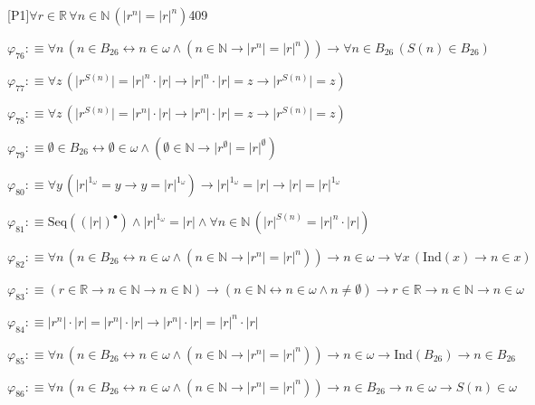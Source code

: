 \begin{fullproof}{[P1]}{$\forall r \in \mathbb{R}\,\forall n \in \mathbb{N}\,(\lvert {{r}^{n}} \rvert = {{\lvert r \rvert}^{n}})$}{409}
\begin{abbrevlist}
\item $\varphi_{76} :\equiv \forall n\,(n \in B_{26} \leftrightarrow n \in \omega \land (n \in \mathbb{N} \to \lvert {{r}^{n}} \rvert = {{\lvert r \rvert}^{n}})) \to \forall n \in B_{26}\,(S(n) \in B_{26})$
\item $\varphi_{77} :\equiv \forall z\,(\lvert {{r}^{S(n)}} \rvert = {{\lvert r \rvert}^{n}} \cdot \lvert r \rvert \to {{\lvert r \rvert}^{n}} \cdot \lvert r \rvert = z \to \lvert {{r}^{S(n)}} \rvert = z)$
\item $\varphi_{78} :\equiv \forall z\,(\lvert {{r}^{S(n)}} \rvert = \lvert {{r}^{n}} \rvert \cdot \lvert r \rvert \to \lvert {{r}^{n}} \rvert \cdot \lvert r \rvert = z \to \lvert {{r}^{S(n)}} \rvert = z)$
\item $\varphi_{79} :\equiv \emptyset \in B_{26} \leftrightarrow \emptyset \in \omega \land (\emptyset \in \mathbb{N} \to \lvert {{r}^{\emptyset}} \rvert = {{\lvert r \rvert}^{\emptyset}})$
\item $\varphi_{80} :\equiv \forall y\,({{\lvert r \rvert}^{1_{\omega}}} = y \to y = {{\lvert r \rvert}^{1_{\omega}}}) \to {{\lvert r \rvert}^{1_{\omega}}} = \lvert r \rvert \to \lvert r \rvert = {{\lvert r \rvert}^{1_{\omega}}}$
\item $\varphi_{81} :\equiv \mathrm{Seq}({(\lvert r \rvert)^{\bullet}}) \land {{\lvert r \rvert}^{1_{\omega}}} = \lvert r \rvert \land \forall n \in \mathbb{N}\,({{\lvert r \rvert}^{S(n)}} = {{\lvert r \rvert}^{n}} \cdot \lvert r \rvert)$
\item $\varphi_{82} :\equiv \forall n\,(n \in B_{26} \leftrightarrow n \in \omega \land (n \in \mathbb{N} \to \lvert {{r}^{n}} \rvert = {{\lvert r \rvert}^{n}})) \to n \in \omega \to \forall x\,(\mathrm{Ind}(x) \to n \in x)$
\item $\varphi_{83} :\equiv (r \in \mathbb{R} \to n \in \mathbb{N} \to n \in \mathbb{N}) \to (n \in \mathbb{N} \leftrightarrow n \in \omega \land n \neq \emptyset) \to r \in \mathbb{R} \to n \in \mathbb{N} \to n \in \omega$
\item $\varphi_{84} :\equiv \lvert {{r}^{n}} \rvert \cdot \lvert r \rvert = \lvert {{r}^{n}} \rvert \cdot \lvert r \rvert \to \lvert {{r}^{n}} \rvert \cdot \lvert r \rvert = {{\lvert r \rvert}^{n}} \cdot \lvert r \rvert$
\item $\varphi_{85} :\equiv \forall n\,(n \in B_{26} \leftrightarrow n \in \omega \land (n \in \mathbb{N} \to \lvert {{r}^{n}} \rvert = {{\lvert r \rvert}^{n}})) \to n \in \omega \to \mathrm{Ind}(B_{26}) \to n \in B_{26}$
\item $\varphi_{86} :\equiv \forall n\,(n \in B_{26} \leftrightarrow n \in \omega \land (n \in \mathbb{N} \to \lvert {{r}^{n}} \rvert = {{\lvert r \rvert}^{n}})) \to n \in B_{26} \to n \in \omega \to S(n) \in \omega$

\end{abbrevlist}
\end{fullproof}
